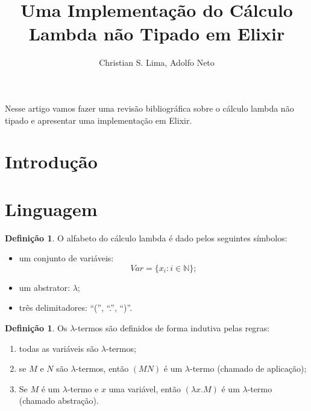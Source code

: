 \documentclass[12pt]{article}
\title{Uma Implementação do Cálculo Lambda não Tipado em Elixir}
\author{Christian S. Lima\inst{1}, Adolfo Neto\inst{1} }
\theoremstyle{definition}
\newtheorem{definition}[theorem]{Definição}
\begin{document}
 

\maketitle

\begin{abstract}

  
\end{abstract}
     
\begin{resumo} 
  Nesse artigo vamos fazer uma revisão bibliográfica sobre o cálculo lambda não tipado e apresentar uma implementação em Elixir.
\end{resumo}


\section{Introdução}

\section{Linguagem} \label{sec:firstpage}

\begin{definition}
  O alfabeto do cálculo lambda é dado pelos seguintes símbolos:
  \begin{itemize}
  \item um conjunto de variáveis:
    $$Var = \{x_i : i \in \mathbb{N}\};$$
  \item um abstrator: $\lambda$;
  \item três delimitadores: ``('', ``.'', ``)''.
  \end{itemize}
\end{definition}
\vspace{1cm}

\begin{definition}
  Os $\lambda$-termos são definidos de forma indutiva pelas regras:
  \begin{enumerate}
  \item todas as variáveis são $\lambda$-termos;
  \item se $M$ e $N$ são $\lambda$-termos, então $(MN)$ é um $\lambda$-termo (chamado de aplicação);
  \item Se $M$ é um $\lambda$-termo e $x$ uma variável, então $(\lambda x.M)$ é um $\lambda$-termo (chamado abstração). 
  \end{enumerate}
\end{definition}
\vspace{1cm}
\end{document}
